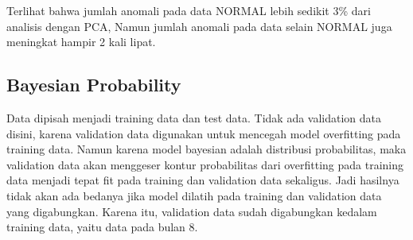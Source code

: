     Terlihat bahwa jumlah anomali pada data NORMAL lebih sedikit 3\% dari analisis dengan PCA, Namun jumlah anomali pada data selain NORMAL juga meningkat hampir 2 kali lipat.

\subsection{Bayesian Probability}

Data dipisah menjadi training data dan test data. Tidak ada validation data disini, karena validation data digunakan untuk mencegah model overfitting pada training data. Namun karena model bayesian adalah distribusi probabilitas, maka validation data akan menggeser kontur probabilitas dari overfitting pada training data menjadi tepat fit pada training dan validation data sekaligus. Jadi hasilnya tidak akan ada bedanya jika model dilatih pada training dan validation data yang digabungkan. Karena itu, validation data sudah digabungkan kedalam training data, yaitu data pada bulan 8.

